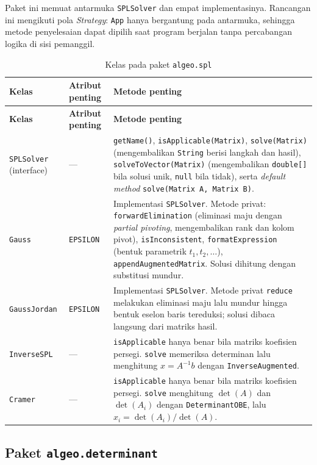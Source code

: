 \documentclass[12pt,a4paper]{report}
\begin{document}
Paket ini memuat antarmuka \texttt{SPLSolver} dan empat implementasinya. Rancangan
ini mengikuti pola \textit{Strategy}: \texttt{App} hanya bergantung pada
antarmuka, sehingga metode penyelesaian dapat dipilih saat program berjalan
tanpa percabangan logika di sisi pemanggil.

\begin{longtable}{L{2.7cm} L{3.6cm} L{8.2cm}}
\caption{Kelas pada paket \texttt{algeo.spl}}\label{tab:kelas-spl}\\
\toprule
\textbf{Kelas} & \textbf{Atribut penting} & \textbf{Metode penting} \\
\midrule
\endfirsthead
\toprule
\textbf{Kelas} & \textbf{Atribut penting} & \textbf{Metode penting} \\
\midrule
\endhead
\bottomrule
\endfoot
\texttt{SPLSolver} (interface) & --- &
\texttt{getName()}, \texttt{isApplicable(Matrix)}, \texttt{solve(Matrix)}
(mengembalikan \texttt{String} berisi langkah dan hasil),
\texttt{solveToVector(Matrix)} (mengembalikan \texttt{double[]} bila solusi
unik, \texttt{null} bila tidak),
serta \textit{default method} \texttt{solve(Matrix A, Matrix B)}. \\
\addlinespace
\texttt{Gauss} & \texttt{EPSILON} &
Implementasi \texttt{SPLSolver}. Metode privat: \texttt{forwardElimination}
(eliminasi maju dengan \textit{partial pivoting}, mengembalikan rank dan kolom
pivot), \texttt{isInconsistent}, \texttt{formatExpression} (bentuk parametrik
$t_1, t_2, \dots$), \texttt{appendAugmentedMatrix}. Solusi dihitung dengan
substitusi mundur. \\
\addlinespace
\texttt{GaussJordan} & \texttt{EPSILON} &
Implementasi \texttt{SPLSolver}. Metode privat \texttt{reduce} melakukan
eliminasi maju lalu mundur hingga bentuk eselon baris tereduksi; solusi
dibaca langsung dari matriks hasil. \\
\addlinespace
\texttt{InverseSPL} & --- &
\texttt{isApplicable} hanya benar bila matriks koefisien persegi. \texttt{solve}
memeriksa determinan lalu menghitung $x = A^{-1}b$ dengan
\texttt{InverseAugmented}. \\
\addlinespace
\texttt{Cramer} & --- &
\texttt{isApplicable} hanya benar bila matriks koefisien persegi. \texttt{solve}
menghitung $\det(A)$ dan $\det(A_i)$ dengan \texttt{DeterminantOBE}, lalu
$x_i = \det(A_i)/\det(A)$. \\
\end{longtable}

\subsection{Paket \texttt{algeo.determinant}}
\end{document}
